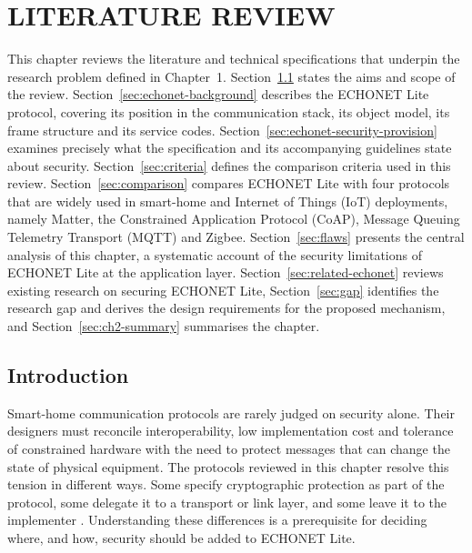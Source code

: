 \chapter{LITERATURE REVIEW}
\label{ch:litreview}

This chapter reviews the literature and technical specifications that underpin the research problem defined in Chapter~1. Section~\ref{sec:lit-intro} states the aims and scope of the review. Section~\ref{sec:echonet-background} describes the ECHONET Lite protocol, covering its position in the communication stack, its object model, its frame structure and its service codes. Section~\ref{sec:echonet-security-provision} examines precisely what the specification and its accompanying guidelines state about security. Section~\ref{sec:criteria} defines the comparison criteria used in this review. Section~\ref{sec:comparison} compares ECHONET Lite with four protocols that are widely used in smart-home and Internet of Things (IoT) deployments, namely Matter, the Constrained Application Protocol (CoAP), Message Queuing Telemetry Transport (MQTT) and Zigbee. Section~\ref{sec:flaws} presents the central analysis of this chapter, a systematic account of the security limitations of ECHONET Lite at the application layer. Section~\ref{sec:related-echonet} reviews existing research on securing ECHONET Lite, Section~\ref{sec:gap} identifies the research gap and derives the design requirements for the proposed mechanism, and Section~\ref{sec:ch2-summary} summarises the chapter.

\section{Introduction}
\label{sec:lit-intro}

Smart-home communication protocols are rarely judged on security alone. Their designers must reconcile interoperability, low implementation cost and tolerance of constrained hardware with the need to protect messages that can change the state of physical equipment. The protocols reviewed in this chapter resolve this tension in different ways. Some specify cryptographic protection as part of the protocol, some delegate it to a transport or link layer, and some leave it to the implementer \cite{Tournier2020,Rizzardi2022}. Understanding these differences is a prerequisite for deciding where, and how, security should be added to ECHONET Lite.

